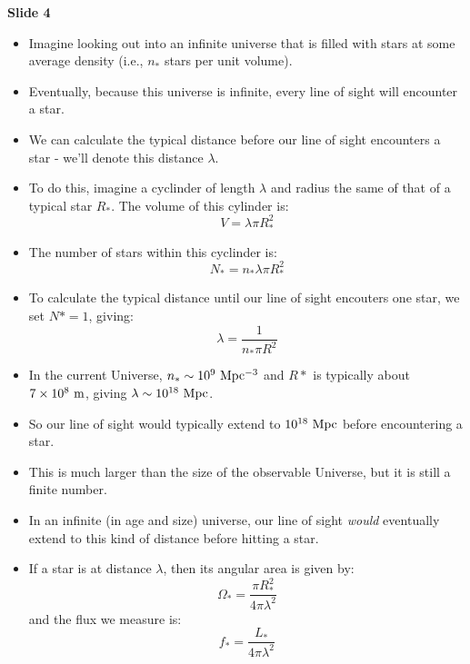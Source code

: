 \documentclass[11pt]{article}
\begin{document}
\noindent
{\bf Slide 4}
\begin{itemize}
  \item Imagine looking out into an infinite universe that is filled with stars at some average density (i.e., $n_\ast$ stars per unit volume).
  \item Eventually, because this universe is infinite, every line of sight will encounter a star.
  \item We can calculate the typical distance before our line of sight encounters a star - we'll denote this distance $\lambda$.
  \item To do this, imagine a cyclinder of length $\lambda$ and radius the same of that of a typical star $R_\ast$. The volume of this cylinder is:
  \begin{equation}
    V = \lambda\pi R_\ast^2
  \end{equation}
  \item The number of stars within this cyclinder is:
  \begin{equation}
    N_\ast = n_\ast\lambda\pi R_\ast^2
  \end{equation}
  \item To calculate the typical distance until our line of sight encouters one star, we set $N\ast=1$, giving:
  \begin{equation}
  \lambda = \frac{1}{n_\ast\pi R^2}
  \end{equation}
  \item In the current Universe, $n_\ast\sim10^9~{\rm Mpc^{-3}}$ and $R\ast$ is typically about $7\times10^8~{\rm m}$, giving $\lambda\sim10^{18}~{\rm Mpc}$.
  \item So our line of sight would typically extend to $10^{18}~{\rm Mpc}$ before encountering a star.
  \item This is much larger than the size of the observable Universe, but it is still a finite number.
  \item In an infinite (in age and size) universe, our line of sight {\it would} eventually extend to this kind of distance before hitting a star.
  \item If a star is at distance $\lambda$, then its angular area is given by:
  \begin{equation}
    \Omega_\ast = \frac{\pi R_\ast^2}{4\pi \lambda^2}
  \end{equation}
  and the flux we measure is:
  \begin{equation}
    f_\ast = \frac{L_\ast}{4\pi \lambda^2}
  \end{equation}

\end{itemize}
\end{document}
